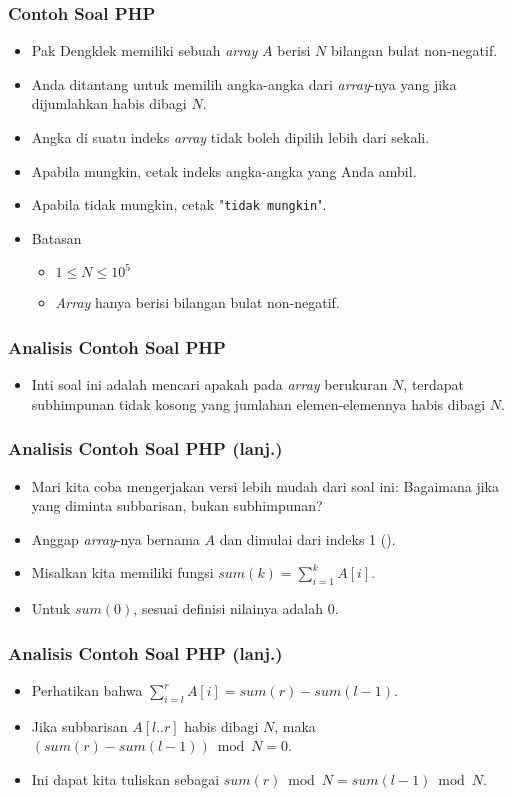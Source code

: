 \begin{frame}
\frametitle{Contoh Soal PHP}
\begin{itemize}
  \item Pak Dengklek memiliki sebuah \textit{array} $A$ berisi $N$ bilangan bulat non-negatif.
  \item Anda ditantang untuk memilih angka-angka dari \textit{array}-nya yang jika dijumlahkan habis dibagi $N$.
  \item Angka di suatu indeks \textit{array} tidak boleh dipilih lebih dari sekali.
  \item Apabila mungkin, cetak indeks angka-angka yang Anda ambil.
  \item Apabila tidak mungkin, cetak "\texttt{tidak mungkin}".
  \item Batasan
  \begin{itemize}
    \item $1 \leq N \leq 10^{5}$
    \item \textit{Array} hanya berisi bilangan bulat non-negatif.
  \end{itemize}
\end{itemize}
\end{frame}

\begin{frame}
\frametitle{Analisis Contoh Soal PHP}
\begin{itemize}
  \item Inti soal ini adalah mencari apakah pada \textit{array} berukuran $N$, terdapat subhimpunan tidak kosong yang jumlahan elemen-elemennya habis dibagi $N$.
\end{itemize}
\end{frame}

\begin{frame}
\frametitle{Analisis Contoh Soal PHP (lanj.)}
\begin{itemize}
  \item Mari kita coba mengerjakan versi lebih mudah dari soal ini:
  Bagaimana jika yang diminta subbarisan, bukan subhimpunan?
  \item Anggap \textit{array}-nya bernama $A$ dan dimulai dari indeks 1 ().
  \item Misalkan kita memiliki fungsi $sum(k) = \sum\limits_{i=1}^k A[i]$.
  \item Untuk $sum(0)$, sesuai definisi nilainya adalah $0$.
\end{itemize}
\end{frame}

\begin{frame}
\frametitle{Analisis Contoh Soal PHP (lanj.)}
\begin{itemize}
  \item Perhatikan bahwa $\sum\limits_{i=l}^r A[i] = sum(r) - sum(l - 1)$.
  \newline
  \item Jika subbarisan $A[l..r]$ habis dibagi $N$, maka $(sum(r) - sum(l - 1)) \bmod N = 0$.
  \newline
  \item Ini dapat kita tuliskan sebagai $sum(r) \bmod N = sum(l - 1) \bmod N$.
\end{itemize}
\end{frame}

